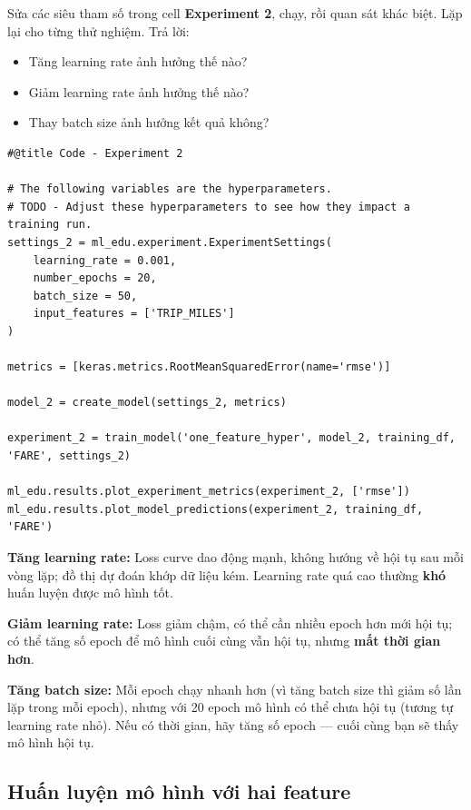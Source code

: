 \documentclass[12pt,a4paper]{article}
\begin{document}
\begin{phuongphap}[title={Hướng dẫn}]
Sửa các siêu tham số trong cell \textbf{Experiment 2}, chạy, rồi quan sát khác biệt. Lặp lại cho từng thử nghiệm.
Trả lời:
\begin{itemize}
  \item Tăng learning rate ảnh hưởng thế nào?
  \item Giảm learning rate ảnh hưởng thế nào?
  \item Thay batch size ảnh hưởng kết quả không?
\end{itemize}
\end{phuongphap}

\begin{lstlisting}
#@title Code - Experiment 2

# The following variables are the hyperparameters.
# TODO - Adjust these hyperparameters to see how they impact a training run.
settings_2 = ml_edu.experiment.ExperimentSettings(
    learning_rate = 0.001,
    number_epochs = 20,
    batch_size = 50,
    input_features = ['TRIP_MILES']
)

metrics = [keras.metrics.RootMeanSquaredError(name='rmse')]

model_2 = create_model(settings_2, metrics)

experiment_2 = train_model('one_feature_hyper', model_2, training_df, 'FARE', settings_2)

ml_edu.results.plot_experiment_metrics(experiment_2, ['rmse'])
ml_edu.results.plot_model_predictions(experiment_2, training_df, 'FARE')
\end{lstlisting}

\begin{vidu}[title={Đáp án tham khảo}]
\textbf{Tăng learning rate:} Loss curve dao động mạnh, không hướng về hội tụ sau mỗi vòng lặp; đồ thị dự đoán khớp dữ liệu kém. Learning rate quá cao thường \textbf{khó} huấn luyện được mô hình tốt.

\medskip
\textbf{Giảm learning rate:} Loss giảm chậm, có thể cần nhiều epoch hơn mới hội tụ; có thể tăng số epoch để mô hình cuối cùng vẫn hội tụ, nhưng \textbf{mất thời gian hơn}.

\medskip
\textbf{Tăng batch size:} Mỗi epoch chạy nhanh hơn (vì tăng batch size thì giảm số lần lặp trong mỗi epoch), nhưng với 20 epoch mô hình có thể chưa hội tụ (tương tự learning rate nhỏ). Nếu có thời gian, hãy tăng số epoch --- cuối cùng bạn sẽ thấy mô hình hội tụ.
\end{vidu}

\subsection{Huấn luyện mô hình với hai feature}
\end{document}
